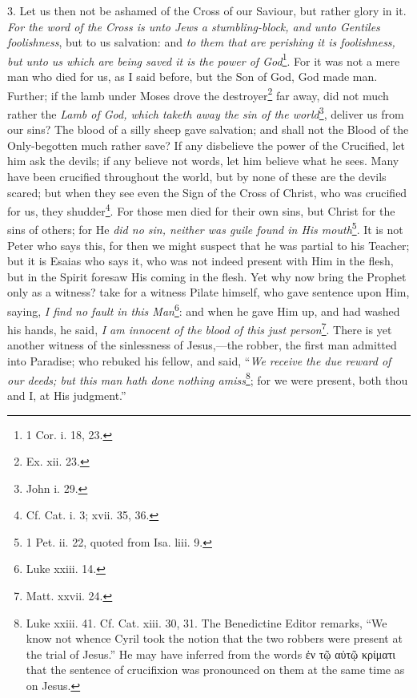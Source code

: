 3. Let us then not be ashamed of the Cross of our Saviour, but rather glory in it. \emph{For the word of the Cross is unto Jews a stumbling-block, and unto Gentiles foolishness}, but to us salvation: and \emph{to them that are perishing it is foolishness, but unto us which are being saved it is the power of God}\footnote{1 Cor. i. 18, 23.}. For it was not a mere man who died for us, as I said before, but the Son of God, God made man. Further; if the lamb under Moses drove the destroyer\footnote{Ex. xii. 23.} far away, did not much rather the \emph{Lamb of God, which taketh away the sin of the world}\footnote{John i. 29.}, deliver us from our sins? The blood of a silly sheep gave salvation; and shall not the Blood of the Only-begotten much rather save? If any disbelieve the power of the Crucified, let him ask the devils; if any believe not words, let him believe what he sees. Many have been crucified throughout the world, but by none of these are the devils scared; but when they see even the Sign of the Cross of Christ, who was crucified for us, they shudder\footnote{Cf. Cat. i. 3; xvii. 35, 36.}. For those men died for their own sins, but Christ for the sins of others; for He \emph{did no sin, neither was guile found in His mouth}\footnote{1 Pet. ii. 22, quoted from Isa. liii. 9.}. It is not Peter who says this, for then we might suspect that he was partial to his Teacher; but it is Esaias who says it, who was not indeed present with Him in the flesh, but in the Spirit foresaw His coming in the flesh. Yet why now bring the Prophet only as a witness? take for a witness Pilate himself, who gave sentence upon Him, saying, \emph{I find no fault in this Man}\footnote{Luke xxiii. 14.}: and when he gave Him up, and had washed his hands, he said, \emph{I am innocent of the blood of this just person}\footnote{Matt. xxvii. 24.}. There is yet another witness of the sinlessness of Jesus,—the robber, the first man admitted into Paradise; who rebuked his fellow, and said, “\emph{We receive the due reward of our deeds; but this man hath done nothing amiss}\footnote{Luke xxiii. 41. Cf. Cat. xiii. 30, 31. The Benedictine Editor remarks, “We know not whence Cyril took the notion that the two robbers were present at the trial of Jesus.” He may have inferred from the words \textgreek{ἐν τῷ αὐτῷ κρίματι} that the sentence of crucifixion was pronounced on them at the same time as on Jesus.}; for we were present, both thou and I, at His judgment.”


